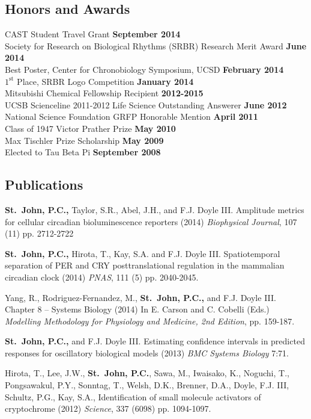 {\subsection*{Honors and Awards} 
CAST Student Travel Grant \hfill {\bfseries September 2014}\\
Society for Research on Biological Rhythms (SRBR) Research Merit Award \hfill {\bf June 2014}\\
Best Poster, Center for Chronobiology Symposium, UCSD \hfill {\bf February 2014} \\
$1^\textrm{st}$ Place, SRBR Logo Competition \hfill {\bf January 2014} \\
Mitsubishi Chemical Fellowship Recipient \hfill {\bf 2012-2015} \\
UCSB Scienceline 2011-2012 Life Science Outstanding Answerer \hfill {\bf June 2012} \\
National Science Foundation GRFP Honorable Mention \hfill {\bf April 2011} \\
Class of 1947 Victor Prather Prize \hfill {\bf May 2010}\\
Max Tischler Prize Scholarship \hfill  {\bf May 2009}\\
Elected to Tau Beta Pi \hfill  {\bf September 2008}\\

\subsection*{Publications}
{\bfseries St.\ John, P.C.,} Taylor, S.R., Abel, J.H., and F.J. Doyle III. Amplitude metrics for cellular circadian bioluminescence reporters (2014) {\itshape Biophysical Journal}, 107 (11) pp. 2712-2722

{\bfseries St.\ John, P.C.,} Hirota, T., Kay, S.A. and F.J. Doyle III.
Spatiotemporal separation of PER and CRY posttranslational regulation in the
mammalian circadian clock (2014) {\itshape PNAS}, 111 (5) pp. 2040-2045.

Yang, R., Rodriguez-Fernandez, M., {\bfseries St.\ John, P.C.,} and F.J. Doyle III. Chapter 8 -- Systems Biology (2014) In E. Carson and C. Cobelli (Eds.)
{\itshape Modelling Methodology for Physiology and Medicine, 2nd Edition}, pp.
159-187.

{\bfseries St.\ John, P.C.,} and F.J. Doyle III. Estimating confidence intervals in predicted responses for oscillatory biological models (2013) {\itshape BMC Systems Biology} 7:71.
 
Hirota, T., Lee, J.W., {\bfseries St.\ John, P.C.}, Sawa, M., Iwaisako, K.,
Noguchi, T., Pongsawakul, P.Y., Sonntag, T., Welsh, D.K., Brenner, D.A., Doyle,
F.J. III, Schultz, P.G., Kay, S.A.,  Identification of small molecule
activators of cryptochrome (2012) {\itshape Science}, 337 (6098) pp. 1094-1097.

}
